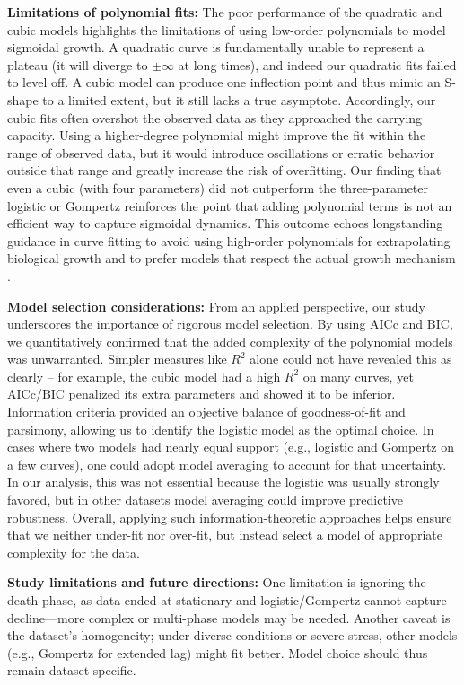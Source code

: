 \documentclass[11pt]{article}
\begin{document}
\textbf{Limitations of polynomial fits:} The poor performance of the quadratic and cubic models highlights the limitations of using low-order polynomials to model sigmoidal growth. A quadratic curve is fundamentally unable to represent a plateau (it will diverge to $\pm\infty$ at long times), and indeed our quadratic fits failed to level off. A cubic model can produce one inflection point and thus mimic an S-shape to a limited extent, but it still lacks a true asymptote. Accordingly, our cubic fits often overshot the observed data as they approached the carrying capacity. Using a higher-degree polynomial might improve the fit within the range of observed data, but it would introduce oscillations or erratic behavior outside that range and greatly increase the risk of overfitting. Our finding that even a cubic (with four parameters) did not outperform the three-parameter logistic or Gompertz reinforces the point that adding polynomial terms is not an efficient way to capture sigmoidal dynamics. This outcome echoes longstanding guidance in curve fitting to avoid using high-order polynomials for extrapolating biological growth and to prefer models that respect the actual growth mechanism \citep{MotulskyChristopoulos2004}.

\textbf{Model selection considerations:} From an applied perspective, our study underscores the importance of rigorous model selection. By using AICc and BIC, we quantitatively confirmed that the added complexity of the polynomial models was unwarranted. Simpler measures like $R^2$ alone could not have revealed this as clearly – for example, the cubic model had a high $R^2$ on many curves, yet AICc/BIC penalized its extra parameters and showed it to be inferior. Information criteria provided an objective balance of goodness-of-fit and parsimony, allowing us to identify the logistic model as the optimal choice. In cases where two models had nearly equal support (e.g., logistic and Gompertz on a few curves), one could adopt model averaging to account for that uncertainty. In our analysis, this was not essential because the logistic was usually strongly favored, but in other datasets model averaging could improve predictive robustness. Overall, applying such information-theoretic approaches helps ensure that we neither under-fit nor over-fit, but instead select a model of appropriate complexity for the data.

\textbf{Study limitations and future directions:} One limitation is ignoring the death phase, as data ended at stationary and logistic/Gompertz cannot capture decline—more complex or multi-phase models may be needed. Another caveat is the dataset’s homogeneity; under diverse conditions or severe stress, other models (e.g., Gompertz for extended lag) might fit better. Model choice should thus remain dataset-specific.
\end{document}
